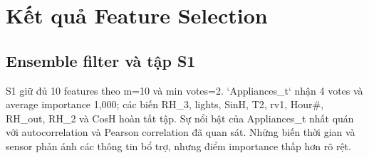\section{Kết quả Feature Selection}\label{kux1ebft-quux1ea3-feature-selection}

\subsection{Ensemble filter và tập S1}\label{ensemble-filter-vuxe0-tux1eadp-s1}

S1 giữ đủ 10 features theo m=10 và min votes=2. `Appliances\_t` nhận 4 votes và average importance 1,000; các biến RH\_3, lights, SinH, T2, rv1, Hour\#, RH\_out, RH\_2 và CosH hoàn tất tập. Sự nổi bật của Appliances\_t nhất quán với autocorrelation và Pearson correlation đã quan sát. Những biến thời gian và sensor phản ánh các thông tin bổ trợ, nhưng điểm importance thấp hơn rõ rệt.

